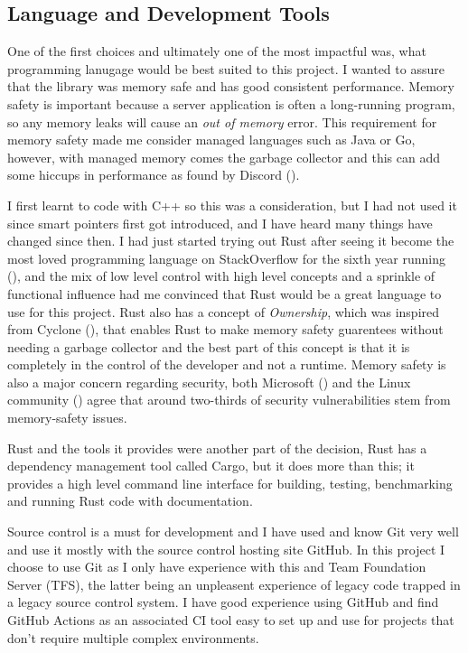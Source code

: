 \documentclass[12pt, a4paper]{article}
\begin{document}
\subsection{Language and Development Tools} \label{ssec:language-and-dev-tools}

One of the first choices and ultimately one of the most impactful was, what programming lanugage
would be best suited to this project. I wanted to assure that the library was memory safe and has
good consistent performance. Memory safety is important because a server application is often a
long-running program, so any memory leaks will cause an \emph{out of memory} error. This requirement
for memory safety made me consider managed languages such as Java or Go, however, with managed memory
comes the garbage collector and this can add some hiccups in performance as found by Discord (\cite{discord}).

I first learnt to code with C++ so this was a consideration, but I had not used it since smart pointers
first got introduced, and I have heard many things have changed since then. I had just started trying out Rust
after seeing it become the most loved programming language on StackOverflow for the sixth year running
(\cite{so-most-loved-lang-2021}), and the mix of low level
control with high level concepts and a sprinkle of functional influence had me convinced that Rust
would be a great language to use for this project. Rust also has a concept of \emph{Ownership},
which was inspired from Cyclone (\cite{cyclone}), that enables Rust to make memory safety
guarentees without needing a garbage collector and the best part of this concept is that it is
completely in the control of the developer and not a runtime. Memory safety is also a major concern regarding
security, both Microsoft (\cite{microsoft-memory-safety}) and the Linux community (\cite{linux-memory-safety})
agree that around two-thirds of security vulnerabilities stem from memory-safety issues.

Rust and the tools it provides were another part of the decision, Rust has a dependency management
tool called Cargo, but it does more than this; it provides a high level command line interface for 
building, testing, benchmarking and running Rust code with documentation.

Source control is a must for development and I have used and know Git very well and use it mostly
with the source control hosting site GitHub. In this project I choose to use Git as I only have
experience with this and Team Foundation Server (TFS), the latter being an unpleasent experience of
legacy code trapped in a legacy source control system. I have good experience using GitHub and
find GitHub Actions as an associated CI tool easy to set up and use for projects that don't require
multiple complex environments. 
\end{document}
